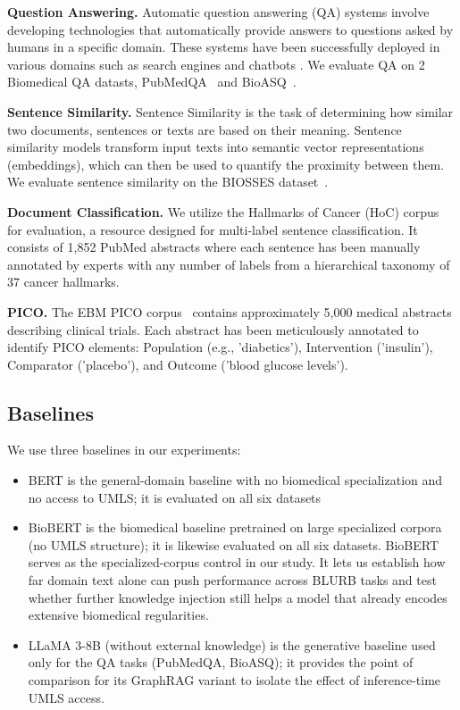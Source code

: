 \documentclass[10pt, a4paper]{article}
\begin{document}
\textbf{ Question Answering.} Automatic question answering (QA) systems involve developing technologies that automatically provide answers to questions asked by humans in a specific domain. These systems have been successfully deployed in various domains such as search engines and chatbots \cite{jin2022biomedical}. We evaluate QA on 2 Biomedical QA datasts, PubMedQA~\cite{jin2019pubmedqa}  and BioASQ~\cite{baker2016automatic}.

\textbf{Sentence Similarity.} Sentence Similarity is the task of determining how similar two documents, sentences or texts are based on their meaning. Sentence similarity models transform input texts into semantic vector representations (embeddings), which can then be used to quantify the proximity between them. We evaluate sentence similarity on the BIOSSES dataset~\cite{souganciouglu2017biosses}.

\textbf{Document Classification.} We utilize the Hallmarks of Cancer (HoC) corpus~\cite{hanahan2000hallmarks} for evaluation, a resource designed for multi-label sentence classification. It consists of 1,852 PubMed abstracts where each sentence has been manually annotated by experts with any number of labels from a hierarchical taxonomy of 37 cancer hallmarks.

\textbf{PICO.} The EBM PICO corpus~\cite{nye2018corpus} contains approximately 5,000 medical abstracts describing clinical trials. Each abstract has been meticulously annotated to identify PICO elements: Population (e.g., 'diabetics'), Intervention ('insulin'), Comparator ('placebo'), and Outcome ('blood glucose levels').
\subsection{Baselines}
We use three baselines in our experiments:
\begin{itemize}
    \item BERT is the general-domain baseline with no biomedical specialization and no access to UMLS; it is evaluated on all six datasets
    \item BioBERT is the biomedical baseline pretrained on large specialized corpora (no UMLS structure); it is likewise evaluated on all six datasets. BioBERT serves as the specialized-corpus control in our study. It lets us establish how far domain text alone can push performance across BLURB tasks and test whether further knowledge injection still helps a model that already encodes extensive biomedical regularities.
    \item LLaMA 3-8B (without external knowledge) is the generative baseline used only for the QA tasks (PubMedQA, BioASQ); it provides the point of comparison for its GraphRAG variant to isolate the effect of inference-time UMLS access.
\end{itemize}
\end{document}
